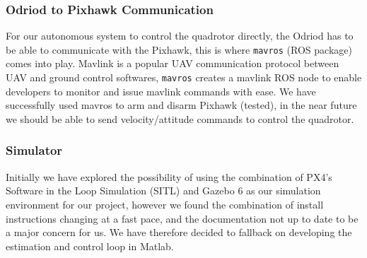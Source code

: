\documentclass[11pt, twocolumn]{article}
\begin{document}
\subsubsection{Odriod to Pixhawk Communication}
For our autonomous system to control the quadrotor directly, the Odriod has to be able to communicate with the Pixhawk, this is where \verb|mavros| (ROS package) comes into play. Mavlink is a popular UAV communication protocol between UAV and ground control softwares, \verb|mavros| creates a mavlink ROS node to enable developers to monitor and issue mavlink commands with ease. We have successfully used mavros to arm and disarm Pixhawk (tested), in the near future we should be able to send velocity/attitude commands to control the quadrotor.

\subsubsection{Simulator}
Initially we have explored the possibility of using the combination of PX4's Software in the Loop Simulation (SITL) and Gazebo 6 as our simulation environment for our project, however we found the combination of install instructions changing at a fast pace, and the documentation not up to date to be a major concern for us. We have therefore decided to fallback on developing the estimation and control loop in Matlab.
\end{document}
